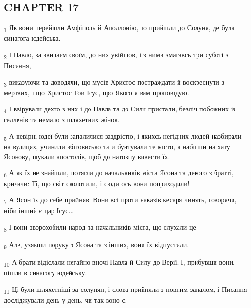 \subsection{CHAPTER 17}
\begin{tcolorbox}
\textsubscript{1} Як вони перейшли Амфіполь й Аполлонію, то прийшли до Солуня, де була синагога юдейська.
\end{tcolorbox}
\begin{tcolorbox}
\textsubscript{2} І Павло, за звичаєм своїм, до них увійшов, і з ними змагавсь три суботі з Писання,
\end{tcolorbox}
\begin{tcolorbox}
\textsubscript{3} виказуючи та доводячи, що мусів Христос постраждати й воскреснути з мертвих, і що Христос Той Ісус, про Якого я вам проповідую.
\end{tcolorbox}
\begin{tcolorbox}
\textsubscript{4} І ввірували дехто з них і до Павла та до Сили пристали, безліч побожних із гелленів та немало з шляхетних жінок.
\end{tcolorbox}
\begin{tcolorbox}
\textsubscript{5} А невірні юдеї були запалилися заздрістю, і якихсь негідних людей назбирали на вулицях, учинили збіговисько та й бунтували те місто, а набігши на хату Ясонову, шукали апостолів, щоб до натовпу вивести їх.
\end{tcolorbox}
\begin{tcolorbox}
\textsubscript{6} А як їх не знайшли, потягли до начальників міста Ясона та декого з братті, кричачи: Ті, що світ сколотили, і сюди ось вони поприходили!
\end{tcolorbox}
\begin{tcolorbox}
\textsubscript{7} А Ясон їх до себе прийняв. Вони всі проти наказів кесаря чинять, говорячи, ніби інший є цар Ісус...
\end{tcolorbox}
\begin{tcolorbox}
\textsubscript{8} І вони зворохобили народ та начальників міста, що слухали це.
\end{tcolorbox}
\begin{tcolorbox}
\textsubscript{9} Але, узявши поруку з Ясона та з інших, вони їх відпустили.
\end{tcolorbox}
\begin{tcolorbox}
\textsubscript{10} А брати відіслали негайно вночі Павла й Силу до Верії. І, прибувши вони, пішли в синагогу юдейську.
\end{tcolorbox}
\begin{tcolorbox}
\textsubscript{11} Ці були шляхетніші за солунян, і слова прийняли з повним запалом, і Писання досліджували день-у-день, чи так воно є.
\end{tcolorbox}
